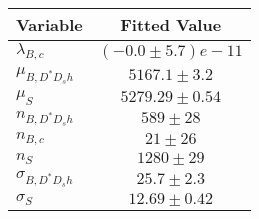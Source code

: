 \begin{tabular}[t]{lc}
\hline
Variable &Fitted Value\\
\hline\hline
$\lambda_{B,c}$&$(-0.0\pm5.7)e-11$\\
\hline
$\mu_{B, D^* D_s h}$&$5167.1\pm3.2$\\
\hline
$\mu_S$&$5279.29\pm0.54$\\
\hline
$n_{B, D^* D_s h}$&$589\pm28$\\
\hline
$n_{B,c}$&$21\pm26$\\
\hline
$n_S$&$1280\pm29$\\
\hline
$\sigma_{B, D^* D_s h}$&$25.7\pm2.3$\\
\hline
$\sigma_S$&$12.69\pm0.42$\\
\hline
\end{tabular}